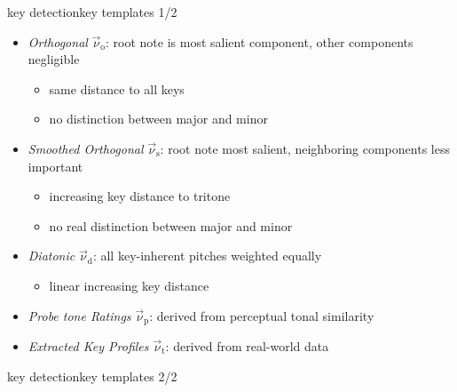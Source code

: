         \begin{frame}{key detection}{key templates 1/2}
                    \begin{itemize}
                        \item	\emph{Orthogonal} $\vec{\nu}_\mathrm{o}$: root note is most salient component, other components negligible
                                \pause
                                \begin{itemize}
                                    \item	same distance to all keys
                                    \item	no distinction between major and minor
                                \end{itemize}
                        \item<2->	\emph{Smoothed Orthogonal} $\vec{\nu}_\mathrm{s}$:  root note most salient, neighboring components less important
                                \pause
                                \begin{itemize}
                                    \item	increasing key distance to tritone
                                    \item	no real distinction between major and minor
                                \end{itemize}
                        \item<3->	\emph{Diatonic} $\vec{\nu}_\mathrm{d}$: all key-inherent pitches weighted equally
                                \pause
                                \begin{itemize}
                                    \item	linear increasing key distance
                                \end{itemize}
                        \item<4->	\emph{Probe tone Ratings}  $\vec{\nu}_\mathrm{p}$: derived from perceptual tonal similarity
                        \item<5->	\emph{Extracted Key Profiles} $\vec{\nu}_\mathrm{t}$: derived from real-world data
                    \end{itemize}
        \end{frame}
        \begin{frame}{key detection}{key templates 2/2}
        \end{frame}

